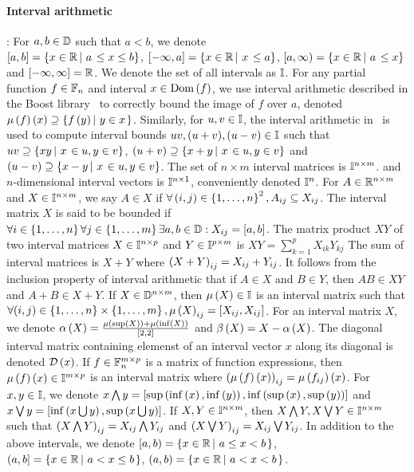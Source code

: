 \paragraph{Interval arithmetic}:  For $a,b\in\mathbb{D}$ such that $a<b$, we
denote\\ $\left[a,b\right] = \left\{x\in\mathbb{R}\left|~a\right.\leq x\leq b\right\}$,
$[-\infty,a] = \left\{x\in\mathbb{R}\left|~x\right.\leq a\right\}$, $[a,\infty)
= \left\{x\in\mathbb{R}\left|~a\right.\leq x\right\}$ and $[-\infty,\infty] = \mathbb{R}$.  We
denote the set of all intervals as $\mathbb{I}$.  For any partial
function $f\in \mathbb{F}_{n}$ and interval $x\in\operatorname{Dom}\left(f\right)$, we use interval
arithmetic described in the Boost library~\cite{bronnimann2006design}
to correctly bound the image of $f$ over $a$, denoted
$\mu\left(f\right)\left(x\right) \supseteq \left\{f\left(y\right)\left|~y\in x\right. \right\}$.  Similarly, for
$u,v\in\mathbb{I}$, the interval arithmetic
in~\cite{bronnimann2006design} is used to compute interval bounds
$uv,(u+v),(u-v)\in\mathbb{I}$ such that $uv\supseteq\left\{xy\left|~x\right.\in u,
y\in v\right\}$, $\left(u+v\right)\supseteq\left\{x+y\left|~x\right.\in u, y\in v\right\}$ and
$\left(u-v\right)\supseteq\left\{x-y\left|~x\right.\in u, y\in v\right\}$.
%
The set of $n\times m$ interval matrices is $\mathbb{I}^{n\times m}$.
and $n$-dimensional interval vectors is $\mathbb{I}^{n\times 1}$,
conveniently denoted $\mathbb{I}^{n}$.  For $A\in\mathbb{R}^{n\times m}$
and $X\in\mathbb{I}^{n\times m}$, we say $A\in X$ if $\forall
\left(i,j\right)\in\left\{1,\ldots,n\right\}^2, A_{ij}\subseteq X_{ij}$.  The interval
matrix $X$ is said to be bounded if $\forall
i\in\left\{1,\ldots,n\right\}\forall j\in\left\{1,\ldots,m\right\} \exists
a,b\in\mathbb{D}: X_{ij} = [a,b]$.  The matrix product $XY$ of two
interval matrices $X\in\mathbb{I}^{n\times p}$ and
$Y\in\mathbb{I}^{p\times m}$ is $XY = \sum_{k=1}^pX_{ik}Y_{kj}$ The
sum of interval matrices is $X + Y$ where $\left(X+Y\right)_{ij} = X_{ij} +
Y_{ij}$.  It follows from the inclusion property of interval
arithmetic that if $A\in X$ and $B\in Y$, then $AB\in XY$ and $A+B\in
X+Y$.  If $X\in\mathbb{D}^{n\times m}$, then $\mu\left(X\right)\in\mathbb{I}$ is
an interval matrix such that $\forall
(i,j)\in\left\{1,\ldots,n\right\}\times\left\{1,\ldots,m\right\},\mu\left(X\right)_{ij} =
[X_{ij},X_{ij}]$.  For an interval matrix $X$, we denote $\alpha\left(X\right) =
\frac{\mu\left(\sup\left(X\right)\right) + \mu\left(\inf\left(X\right)\right)}{[2,2]}$ and $\beta\left(X\right) =
X - \alpha\left(X\right)$.  The diagonal interval matrix containing elemenst of an
interval vector $x$ along its diagonal is denoted $\mathcal{D}\left(x\right)$.  If
$f\in\mathbb{F}_{n}^{m\times p}$ is a matrix of function expressions, then
$\mu\left(f\right)\left(x\right)\in \mathbb{I}^{m\times p}$ is an interval matrix where
$\left(\mu\left(f\right)\left(x\right)\right)_{ij} = \mu\left(f_{ij}\right)\left(x\right)$.  For $x,y\in\mathbb{I}$, we
denote $x\bigwedge y =
[\sup\left(\inf\left(x\right),\inf\left(y\right)\right),\inf\left(\sup\left(x\right),\sup\left(y\right)\right)]$ and
$x\bigvee y = [\inf\left(x\bigcup y\right), \sup\left(x\bigcup y\right)]$.  If
$X,Y\in\mathbb{I}^{n\times m}$, then
$X\bigwedge Y,X\bigvee Y\in\mathbb{I}^{n\times m}$ such that
$\left(X\bigwedge Y\right)_{ij} = X_{ij}\bigwedge Y_{ij}$ and
$\left(X\bigvee Y\right)_{ij} = X_{ij}\bigvee Y_{ij}$.
%
In addition to the above intervals, we denote
%
$[a,b) = \left\{x\in\mathbb{R}\left|~a\leq x<b\right.\right\}$, $(a,b] = \left\{x\in\mathbb{R}\left|~a< x\leq b\right.\right\}$, $(a,b) = \left\{x\in\mathbb{R}\left|~a< x < b\right.\right\}$.

